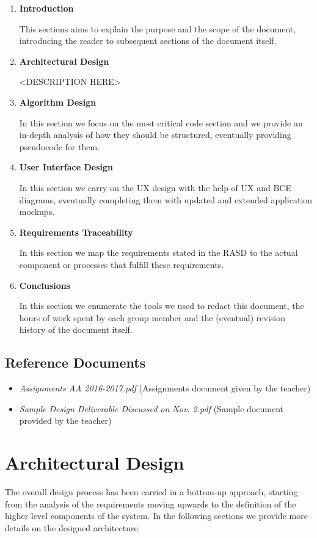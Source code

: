 \documentclass[11pt]{article} %
\begin{document}
\begin{enumerate}
	\item \textbf{Introduction}

	This sections aims to explain the purpose and the scope of the document, introducing the reader to subsequent sections of the document itself.

	\item \textbf{Architectural Design}
	
	<DESCRIPTION HERE>

	\item \textbf{Algorithm Design}

	In this section we focus on the most critical code section and we provide an in-depth analysis of how they should be structured, eventually providing pseudocode for them.
	
	\item \textbf{User Interface Design}

	In this section we carry on the UX design with the help of UX and BCE diagrams, eventually completing them with updated and extended application mockups.

	\item \textbf{Requirements Traceability}
	
	In this section we map the requirements stated in the RASD to the actual component or processes that fulfill these requirements.

	\item \textbf{Conclusions}

	In this section we enumerate the tools we used to redact this document, the hours of work spent by each group member and the (eventual) revision history of the document itself.
\end{enumerate}

\subsection{Reference Documents}
\begin{itemize}
	\item \textit{Assignments AA 2016-2017.pdf} (Assignments document given by the teacher)
	\item \textit{Sample Design Deliverable Discussed on Nov. 2.pdf} (Sample document provided by the teacher)
  \end{itemize}




\newpage
\section{Architectural Design}
The overall design process has been carried in a bottom-up approach, starting from the analysis of the requirements moving upwards to the definition of the higher level components of the system. In the following sections we provide more details on the designed architecture.
\end{document}
